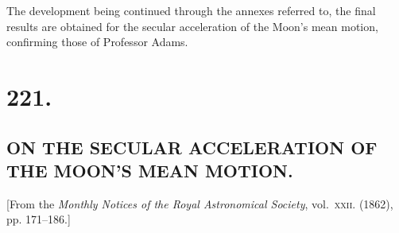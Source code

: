 \documentclass[11pt,a4paper]{book}
\begin{document}
{{The development being continued through the annexes referred to, the final results are obtained for the secular acceleration of the Moon's mean motion, confirming those of Professor Adams.
\clearpage



\section*{\large 221.}
\subsection*{ON THE SECULAR ACCELERATION OF THE MOON'S MEAN MOTION.}

\begin{center}
[From the \textit{Monthly Notices of the Royal Astronomical Society}, vol.~\textsc{xxii}. (1862), pp. 171--186.]
\end{center}

\medskip

}}
\end{document}
